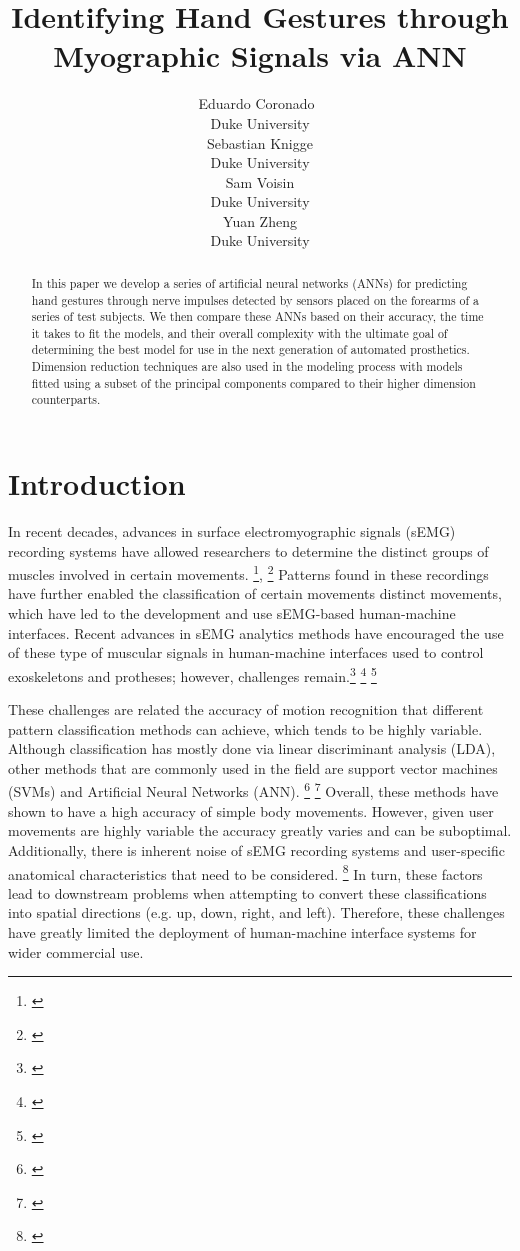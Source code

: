\documentclass{article}
\title{Identifying Hand Gestures through Myographic Signals via ANN}
\author{%
  Eduardo Coronado\ \\
  Duke University \\
  \And
   Sebastian Knigge \\
   Duke University \\
  \AND
  Sam Voisin \\
  Duke University \\
  \And
  Yuan Zheng \\
  Duke University \\
}
\begin{document}

\maketitle

\begin{abstract}
 In this paper we develop a series of artificial neural networks (ANNs) for predicting hand gestures through nerve impulses detected by sensors placed on the forearms of a series of test subjects. We then compare these ANNs based on their accuracy, the time it takes to fit the models, and their overall complexity with the ultimate goal of determining the best model for use in the next generation of automated prosthetics. Dimension reduction techniques are also used in the modeling process with models fitted using a subset of the principal components compared to their higher dimension counterparts.
\end{abstract}

\section{Introduction}
In recent decades, advances in surface electromyographic signals (sEMG) recording systems have allowed researchers to determine the distinct groups of muscles involved in certain movements. \footnote{\cite{bishop2004}}, \footnote{\cite{winter1991}}  Patterns found in these recordings have further enabled the classification  of certain movements distinct movements, which have led to the development and use sEMG-based human-machine interfaces. Recent advances in sEMG analytics methods have encouraged the use of these type of muscular signals in human-machine interfaces used to control exoskeletons and protheses; however, challenges remain.\footnote{\cite{Sensorpaper}} \footnote{\cite{kiguchi2012}} \footnote{\cite{roche2014}}

These challenges are related the accuracy of motion recognition that different pattern classification methods can achieve, which tends to be highly variable. Although classification has mostly done via linear discriminant analysis (LDA), other methods that are commonly used in the field are support vector machines (SVMs) and Artificial Neural Networks (ANN). \footnote{\cite{LDA}} \footnote{\cite{ANN}}   Overall, these methods have shown to have a high accuracy of simple body movements. However, given user movements are highly variable the accuracy greatly varies and can be suboptimal. Additionally, there is inherent noise of sEMG recording systems and user-specific anatomical characteristics that need to be considered. \footnote{\cite{emgnoise}}    In turn, these factors lead to downstream problems when attempting to convert these classifications into spatial directions (e.g. up, down, right, and left). Therefore, these challenges have greatly limited the deployment of human-machine interface systems for wider commercial use.
\end{document}
